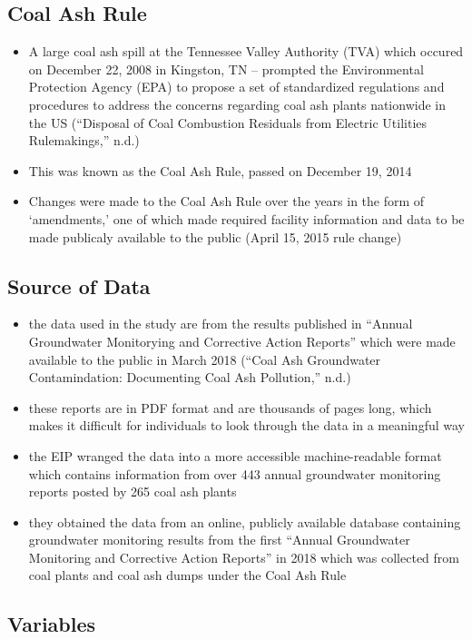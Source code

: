 \documentclass[12pt, twoside]{amherstthesis}
\begin{document}
\hypertarget{coal-ash-rule}{%
\subsection{Coal Ash Rule}\label{coal-ash-rule}}
\begin{itemize}
\item
  A large coal ash spill at the Tennessee Valley Authority (TVA) which occured on December 22, 2008 in Kingston, TN -- prompted the Environmental Protection Agency (EPA) to propose a set of standardized regulations and procedures to address the concerns regarding coal ash plants nationwide in the US (``Disposal of Coal Combustion Residuals from Electric Utilities Rulemakings,'' n.d.)
\item
  This was known as the Coal Ash Rule, passed on December 19, 2014
\item
  Changes were made to the Coal Ash Rule over the years in the form of `amendments,' one of which made required facility information and data to be made publicaly available to the public (April 15, 2015 rule change)
\end{itemize}
\hypertarget{source-of-data}{%
\subsection{Source of Data}\label{source-of-data}}
\begin{itemize}
\item
  the data used in the study are from the results published in ``Annual Groundwater Monitorying and Corrective Action Reports'' which were made available to the public in March 2018 (``Coal Ash Groundwater Contamindation: Documenting Coal Ash Pollution,'' n.d.)
\item
  these reports are in PDF format and are thousands of pages long, which makes it difficult for individuals to look through the data in a meaningful way
\item
  the EIP wranged the data into a more accessible machine-readable format which contains information from over 443 annual groundwater monitoring reports posted by 265 coal ash plants
\item
  they obtained the data from an online, publicly available database containing groundwater monitoring results from the first ``Annual Groundwater Monitoring and Corrective Action Reports'' in 2018 which was collected from coal plants and coal ash dumps under the Coal Ash Rule
\end{itemize}
\hypertarget{variables}{%
\subsection{Variables}\label{variables}}
\end{document}
